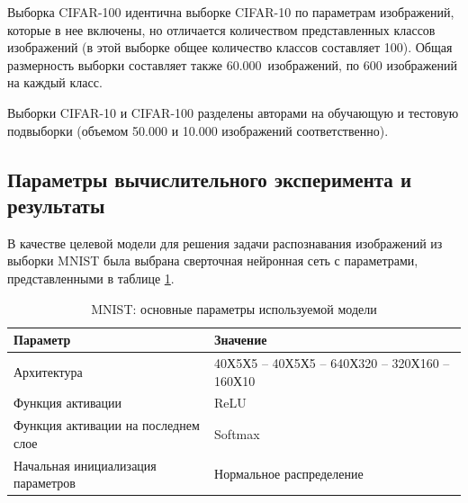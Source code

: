 Выборка CIFAR-100 идентична выборке CIFAR-10 по параметрам изображений, которые в нее включены, но отличается количеством представленных классов изображений (в этой выборке общее количество классов составляет 100). Общая размерность выборки составляет также 60.000~изображений, по 600 изображений на каждый класс.

Выборки CIFAR-10 и CIFAR-100 разделены авторами на обучающую и тестовую подвыборки (объемом 50.000 и 10.000 изображений соответственно).



\subsection{Параметры вычислительного эксперимента и результаты}

В качестве целевой модели для решения задачи распознавания изображений из выборки MNIST была выбрана сверточная нейронная сеть с параметрами, представленными в таблице \ref{table:mnist_conv_model}.

\begin{table} [!h]
  \caption{MNIST: основные параметры используемой модели}\label{table:mnist_conv_model}
\centering
\begin{tabular}{| p{7cm} | p{8cm} |}
  \hline
    \textbf{Параметр} & \textbf{Значение}\\
    \hline
    Архитектура & 40Х5Х5 -- 40Х5Х5 -- 640Х320 -- 320Х160 -- 160Х10\\
    \hline
    Функция активации & ReLU \\
    \hline
    Функция активации на последнем слое & Softmax \\
    Начальная инициализация параметров & Нормальное распределение \\
    \hline
\end{tabular}
\end{table}


